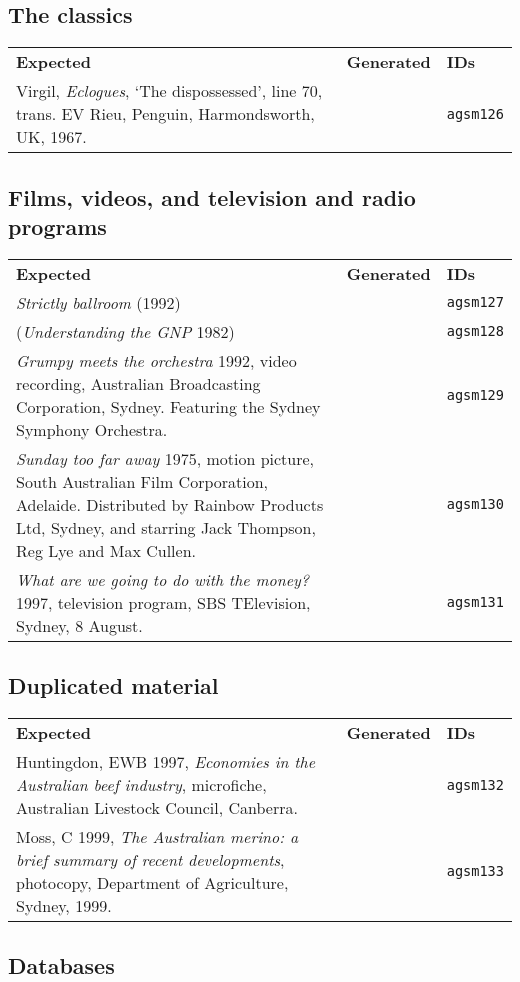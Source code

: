 \documentclass[a4paper,landscape,12pt]{article}
\newlength\q
\newlength\qr
\newenvironment{citetable}
  {\noindent\begin{longtable}{p{\q} p{\q} p{\qr}}\textbf{Expected} & \textbf{Generated} & \textbf{IDs}\\}
  {\end{longtable}}
\begin{document}
\subsection{The classics}

\begin{citetable}
	Virgil, \textit{Eclogues}, `The dispossessed', line 70, trans. EV Rieu, Penguin, Harmondsworth, UK, 1967. & & \texttt{agsm126} \\
\end{citetable}

\subsection{Films, videos, and television and radio programs}

\begin{citetable}
	\textit{Strictly ballroom} (1992) & & \texttt{agsm127} \\
	(\textit{Understanding the GNP} 1982) & & \texttt{agsm128} \\
	\textit{Grumpy meets the orchestra} 1992, video recording, Australian Broadcasting Corporation, Sydney. Featuring the Sydney Symphony Orchestra. & & \texttt{agsm129} \\
	\textit{Sunday too far away} 1975, motion picture, South Australian Film Corporation, Adelaide. Distributed by Rainbow Products Ltd, Sydney, and starring Jack Thompson, Reg Lye and Max Cullen. & & \texttt{agsm130} \\
	\textit{What are we going to do with the money?} 1997, television program, SBS TElevision, Sydney, 8 August. & & \texttt{agsm131} \\
\end{citetable}

\subsection{Duplicated material}

\begin{citetable}
	Huntingdon, EWB 1997, \textit{Economies in the Australian beef industry}, microfiche, Australian Livestock Council, Canberra. & & \texttt{agsm132} \\
	Moss, C 1999, \textit{The Australian merino: a brief summary of recent developments}, photocopy, Department of Agriculture, Sydney, 1999. & & \texttt{agsm133} \\
\end{citetable}

\subsection{Databases}
\end{document}
